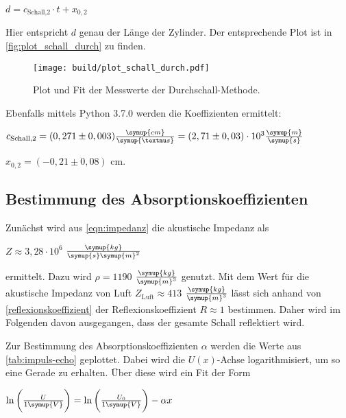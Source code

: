\begin{center}
    $d = c_\text{Schall,2} \cdot t + x_{0,2}$
\end{center}

Hier entspricht $d$ genau der Länge der Zylinder. Der entsprechende Plot ist in \autoref{fig:plot_schall_durch} zu finden.

\begin{figure}
    \centering
    \texttt{[image: build/plot\_schall\_durch.pdf]}
    \caption{Plot und Fit der Messwerte der Durchschall-Methode.}
    \label{fig:plot_schall_durch}
\end{figure}

Ebenfalls mittels Python 3.7.0 werden die Koeffizienten ermittelt:

\begin{center}
    $c_\text{Schall,2} = (0,271 \pm 0,003) \frac{\symup{cm}}{\symup{µs}} = (2,71 \pm 0,03) \cdot 10^{3} \frac{\symup{m}}{\symup{s}}$
    
    $x_{0,2} = (-0,21 \pm 0,08)$ cm.
\end{center}


\subsection{Bestimmung des Absorptionskoeffizienten}

Zunächst wird aus \eqref{eqn:impedanz} die akustische Impedanz als

\begin{center}
    $Z \approx 3,28 \cdot 10^{6}$ $\frac{\symup{kg}}{\symup{s}\symup{m}^2}$
\end{center}

ermittelt. Dazu wird $\rho = 1190$ $\frac{\symup{kg}}{\symup{m}^3}$ \cite{pmma} genutzt. 
Mit dem Wert für die akustische Impedanz von Luft $Z_\text{Luft} \approx 413$ $\frac{\symup{kg}}{\symup{m}^3}$\cite{akImLuft} lässt sich anhand von \eqref{reflexionskoeffizient} der Reflexionskoeffizient $R \approx 1$ bestimmen.
Daher wird im Folgenden davon ausgegangen, dass der gesamte Schall reflektiert wird.

Zur Bestimmung des Absorptionskoeffizienten $\alpha$ werden die Werte aus \autoref{tab:impuls-echo} geplottet.
Dabei wird die $U(x)$-Achse logarithmisiert, um so eine Gerade zu erhalten.
Über diese wird ein Fit der Form

\begin{center}
    $\ln \bigg( \frac{U}{1 \symup{V}} \bigg) = \ln \bigg( \frac{U_0}{1 \symup{V}} \bigg) - \alpha x$
\end{center}

